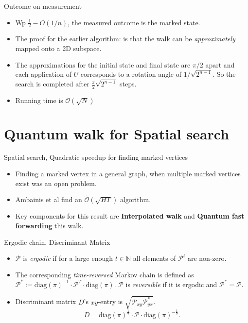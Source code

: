 \documentclass[10pt]{beamer}
\newcommand{\bigO}[1]{\mathcal{O}\left( #1 \right)}
\newcommand{\bigOt}[1]{\widetilde{\mathcal{O}}\left( #1 \right)}
\newcommand{\diag}[1]{\mathrm{diag}\left( #1 \right)}
\newcommand{\N}{\mathbb{N}}
\newcommand{\PM}{\mathcal{P}}
\begin{document}
\begin{frame}{Outcome on measurement}
    \begin{itemize}
        \item Wp $\frac{1}{2} - O(1/n)$, the measured outcome is the marked state.
        \item The proof for the earlier algorithm: is that the walk can be \textit{approximately} mapped onto a 2D subspace.
        \item The approximations for the initial state and final state are $\pi/2$ apart and each application of $U$ corresponds to a rotation angle of $1/\sqrt{2^{n-1}}$. So the search is completed after $\frac{\pi}{2} \sqrt{2^{n-1}}$ steps.
        \item Running time is $\bigO{\sqrt{N}}$
    \end{itemize}
\end{frame}
\section{Quantum walk for Spatial search}
\begin{frame}{Spatial search, Quadratic speedup for finding marked vertices}
    \begin{itemize}
        \item Finding a marked vertex in a general graph, when multiple marked vertices exist was an open problem.
        \item Ambainis et al find an  $\bigOt{\sqrt{HT}}$ algorithm.
        \item Key components for this result are \textbf{Interpolated walk} and \textbf{Quantum fast forwarding} this walk.
    \end{itemize}
\end{frame}

\begin{frame}{Ergodic chain, Discriminant Matrix}
\begin{itemize}
    \item $\PM$ is \emph{ergodic} if for a large enough $t\in \N$ all elements of $\PM^t$ are non-zero. 
    \item The corresponding \emph{time-reversed} Markov chain is defined as $\PM^*:=\diag{\pi}^{-1}\cdot\PM^T\cdot\diag{\pi}$.  $\PM$ is \emph{reversible} if it is ergodic and $\PM^*=\PM$.
    \item Discriminant matrix $D$'s $xy$-entry is $\sqrt{\PM_{xy}\PM^*_{yx}}$.
        \begin{equation}\label{eq:discriminant}
        D=\diag{\pi}^{\frac12}\cdot\PM\cdot\diag{\pi}^{-\frac12}.
        \end{equation}
        \end{itemize}

\end{frame}
\end{document}
